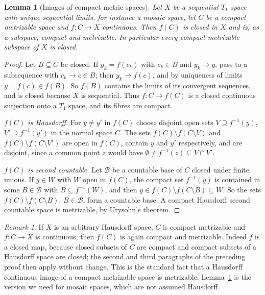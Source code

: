 \documentclass[11pt]{amsart}
\newtheorem{lemma}[theorem]{Lemma}
\theoremstyle{definition}
\theoremstyle{remark}
\newtheorem{remark}[theorem]{Remark}
\numberwithin{equation}{section}
\begin{document}
\begin{lemma}[Images of compact metric spaces]\label{lem:image}
Let $X$ be a sequential $T_1$ space with unique sequential limits, for instance a mosaic space, let $C$ be a compact metrizable space and $f\colon C\to X$ continuous. Then $f(C)$ is closed in $X$ and is, as a subspace, compact and metrizable. In particular every compact metrizable subspace of $X$ is closed.
\end{lemma}
\begin{proof}
Let $B\subseteq C$ be closed. If $y_k=f(c_k)$ with $c_k\in B$ and $y_k\to y$, pass to a subsequence with $c_k\to c\in B$; then $y_k\to f(c)$, and by uniqueness of limits $y=f(c)\in f(B)$. So $f(B)$ contains the limits of its convergent sequences, and is closed because $X$ is sequential. Thus $f\colon C\to f(C)$ is a closed continuous surjection onto a $T_1$ space, and its fibres are compact.

\emph{$f(C)$ is Hausdorff.} For $y\neq y'$ in $f(C)$ choose disjoint open sets $V\supseteq f^{-1}(y)$, $V'\supseteq f^{-1}(y')$ in the normal space $C$. The sets $f(C)\setminus f(C\setminus V)$ and $f(C)\setminus f(C\setminus V')$ are open in $f(C)$, contain $y$ and $y'$ respectively, and are disjoint, since a common point $z$ would have $\emptyset\ne f^{-1}(z)\subseteq V\cap V'$.

\emph{$f(C)$ is second countable.} Let $\mathcal B$ be a countable base of $C$ closed under finite unions. If $y\in W$ with $W$ open in $f(C)$, the compact set $f^{-1}(y)$ is contained in some $B\in\mathcal B$ with $B\subseteq f^{-1}(W)$, and then $y\in f(C)\setminus f(C\setminus B)\subseteq W$. So the sets $f(C)\setminus f(C\setminus B)$, $B\in\mathcal B$, form a countable base. A compact Hausdorff second countable space is metrizable, by Urysohn's theorem.
\end{proof}

\begin{remark}\label{rem:hausimage}
If $X$ is an arbitrary Hausdorff space, $C$ is compact metrizable and $f\colon C\to X$ is continuous, then $f(C)$ is again compact and metrizable. Indeed $f$ is a closed map, because closed subsets of $C$ are compact and compact subsets of a Hausdorff space are closed; the second and third paragraphs of the preceding proof then apply without change. This is the standard fact that a Hausdorff continuous image of a compact metrizable space is metrizable. Lemma~\ref{lem:image} is the version we need for mosaic spaces, which are not assumed Hausdorff.
\end{remark}
\end{document}
